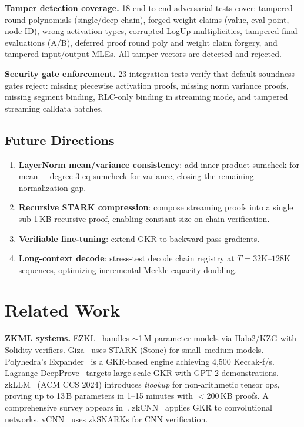 \documentclass[10pt,twocolumn]{article}
\theoremstyle{definition}
\theoremstyle{remark}
\begin{document}
\textbf{Tamper detection coverage.}
18 end-to-end adversarial tests cover: tampered round polynomials
(single/deep-chain), forged weight claims (value, eval point, node ID),
wrong activation types, corrupted LogUp multiplicities, tampered
final evaluations (A/B), deferred proof round poly and weight claim
forgery, and tampered input/output MLEs.  All tamper vectors are
detected and rejected.

\textbf{Security gate enforcement.}
23 integration tests verify that default soundness gates reject:
missing piecewise activation proofs, missing norm variance proofs,
missing segment binding, RLC-only binding in streaming mode,
and tampered streaming calldata batches.

\subsection{Future Directions}

\begin{enumerate}[nosep,leftmargin=1.4em]
  \item \textbf{LayerNorm mean/variance consistency}: add
        inner-product sumcheck for mean + degree-3 eq-sumcheck
        for variance, closing the remaining normalization gap.
  \item \textbf{Recursive STARK compression}: compose streaming
        proofs into a single sub-1\,KB recursive proof, enabling
        constant-size on-chain verification.
  \item \textbf{Verifiable fine-tuning}: extend GKR to backward
        pass gradients.
  \item \textbf{Long-context decode}: stress-test decode chain
        registry at $T\!=\!32\text{K}$--$128\text{K}$ sequences,
        optimizing incremental Merkle capacity doubling.
\end{enumerate}


\section{Related Work}\label{sec:related}

\textbf{ZKML systems.}
EZKL~\cite{ezkl2024} handles $\sim$1\,M-parameter models via Halo2/KZG
with Solidity verifiers.
Giza~\cite{giza2024} uses STARK (Stone) for small--medium models.
Polyhedra's Expander~\cite{polyhedra2024expander} is a GKR-based engine
achieving 4{,}500 Keccak-f/s.
Lagrange DeepProve~\cite{lagrange2024} targets large-scale GKR with
GPT-2 demonstrations.
zkLLM~\cite{sun2024zkllm} (ACM CCS 2024) introduces \emph{tlookup}
for non-arithmetic tensor ops, proving up to 13\,B parameters in
1--15 minutes with $<$200\,KB proofs.
A comprehensive survey appears in~\cite{xing2025zkml}.
zkCNN~\cite{liu2021zkcnn} applies GKR to convolutional networks.
vCNN~\cite{lee2024vcnn} uses zkSNARKs for CNN verification.
\end{document}
